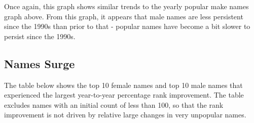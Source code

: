 \documentclass[11pt,preprint]{elsarticle}
\numberwithin{equation}{section}
\numberwithin{figure}{section}
\numberwithin{table}{section}
\begin{document}
Once again, this graph shows similar trends to the yearly popular make
names graph above. From this graph, it appears that male names are less
persistent since the 1990s than prior to that - popular names have
become a bit slower to persist since the 1990s.

\subsection{Names Surge}\label{names-surge}

The table below shows the top 10 female names and top 10 male names that
experienced the largest year-to-year percentage rank improvement. The
table excludes names with an initial count of less than 100, so that the
rank improvement is not driven by relative large changes in very
unpopular names.
\end{document}
